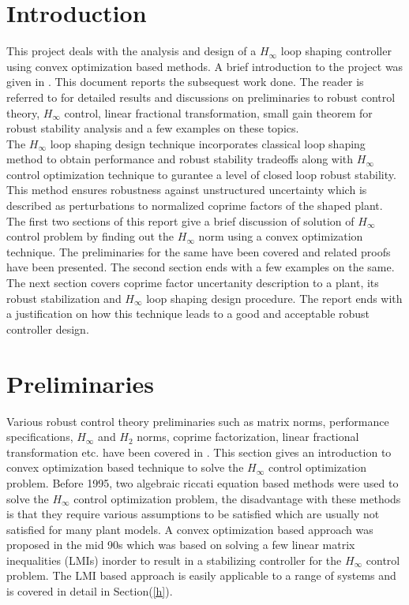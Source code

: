 \documentclass[a4paper,12pt]{article}
\begin{document}
\section{Introduction}
This project deals with the analysis and design of a $H_{\infty}$ loop shaping controller using convex optimization based methods.
A brief introduction to the project was given in \cite{prev}. This document reports the subsequest work done. The reader is referred to \cite{prev} for detailed results and discussions on preliminaries to robust control theory, $H_{\infty}$ control, linear fractional transformation, small gain theorem for robust stability analysis and a few examples on these topics. \\
The $H_{\infty}$ loop shaping design technique incorporates classical loop shaping method to obtain performance and robust stability tradeoffs along with $H_{\infty}$ control optimization technique to gurantee a level of closed loop robust stability. This method ensures robustness against unstructured uncertainty which is described as perturbations to normalized coprime factors of the shaped plant. \\
The first two sections of this report give a brief discussion of solution of $H_{\infty}$ control problem by finding out the $H_{\infty}$ norm using a convex optimization technique. The preliminaries for the same have been covered and related proofs have been presented. The second section ends with a few examples on the same. The next section covers coprime factor uncertanity description to a plant, its robust stabilization and $H_{\infty}$ loop shaping design procedure. The report ends with a justification on how this technique leads to a good and acceptable robust controller design.
\section{Preliminaries}
Various robust control theory preliminaries such as matrix norms, performance specifications, $H_{\infty}$ and $H_{2}$ norms, coprime factorization, linear fractional transformation etc. have been covered in \cite{prev}. This section gives an introduction to  convex optimization based technique to solve the $H_{\infty}$ control optimization problem. Before 1995, two algebraic riccati equation based methods were used to solve the $H_{\infty}$ control optimization problem, the disadvantage with these methods is that they require various assumptions to be satisfied which are usually not satisfied for many plant models. A convex optimization based approach was proposed in the mid 90s which was based on solving a few linear matrix inequalities (LMIs) inorder to result in a stabilizing controller for the $H_{\infty}$ control problem. The LMI based approach is easily applicable to a range of systems and is covered in detail in Section(\ref{h}).
\end{document}
